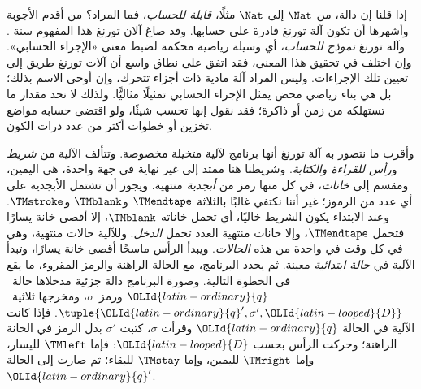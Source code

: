 \documentclass[../../../include/open-logic-section]{subfiles}
\begin{document}

إذا قلنا إن دالة، من $\Nat$ إلى $\Nat$ مثلًا، \emph{قابلة للحساب}، فما المراد؟ من أقدم الأجوبة وأشهرها أن تكون آلة تورنغ قادرة على حسابها. وقد صاغ آلان تورنغ هذا المفهوم سنة . وآلة تورنغ \emph{نموذج للحساب}، أي وسيلة رياضية محكمة لضبط معنى «الإجراء الحسابي». وإن اختلف في تحقيق هذا المعنى، فقد اتفق على نطاق واسع أن آلات تورنغ طريق إلى تعيين تلك الإجراءات. وليس المراد آلة مادية ذات أجزاء تتحرك، وإن أوحى الاسم بذلك؛ بل هي بناء رياضي محض يمثل الإجراء الحسابي تمثيلًا مثاليًّا. ولذلك لا نحد مقدار ما تستهلكه من زمن أو ذاكرة؛ فقد نقول إنها تحسب شيئًا، ولو اقتضى حسابه مواضع تخزين أو خطوات أكثر من عدد ذرات الكون.

\begin{explain}
وأقرب ما نتصور به آلة تورنغ أنها برنامج لآلية متخيلة مخصوصة. وتتألف الآلية من \emph{شريط} و\emph{رأس للقراءة والكتابة}. وشريطنا هنا ممتد إلى غير نهاية في جهة واحدة، هي اليمين، ومقسم إلى \emph{خانات}، في كل منها رمز من \emph{أبجدية} منتهية. ويجوز أن تشتمل الأبجدية على أي عدد من الرموز؛ غير أننا نكتفي غالبًا بالثلاثة $\TMendtape$ و$\TMblank$ و$\TMstroke$. وعند الابتداء يكون الشريط خاليًا، أي تحمل خاناته $\TMblank$، إلا أقصى خانة يسارًا فتحمل $\TMendtape$، وإلا خانات منتهية العدد تحمل \emph{الدخل}. وللآلية حالات منتهية، وهي في كل وقت في واحدة من هذه \emph{الحالات}. ويبدأ الرأس ماسحًا أقصى خانة يسارًا، وتبدأ الآلية في \emph{حالة ابتدائية} معينة. ثم يحدد البرنامج، مع الحالة الراهنة والرمز المقروء، ما يقع في الخطوة التالية. وصورة البرنامج دالة جزئية مدخلاها حالة~${\OLId{latin-ordinary}{q}}$ ورمز~$\sigma$، ومخرجها ثلاثية~$\tuple{{\OLId{latin-ordinary}{q}}',
  \sigma',{\OLId{latin-looped}{D}}}$. فإذا كانت الآلية في الحالة ${\OLId{latin-ordinary}{q}}$ وقرأت $\sigma$، كتبت $\sigma'$ بدل الرمز في الخانة الراهنة؛ وحركت الرأس بحسب ${\OLId{latin-looped}{D}}$: فإما $\TMleft$ لليسار، وإما $\TMright$ لليمين، وإما $\TMstay$ للبقاء؛ ثم صارت إلى الحالة~${\OLId{latin-ordinary}{q}}'$.


\end{explain}
\end{document}
